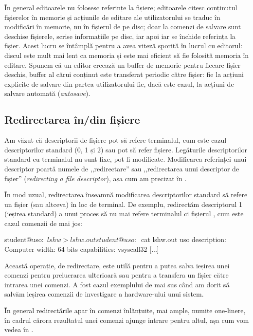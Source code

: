 În general editoarele
nu folosesc referințe la fișiere; editoarele citesc conținutul fișierelor în
memorie și acțiunile de editare ale utilizatorului se traduc în modificări în
memorie, nu în fișierul de pe disc; doar la comenzi de salvare sunt deschise
fișierele, scrise informațiile pe disc, iar apoi iar se închide referința la
fișier. Acest lucru se întâmplă pentru a avea viteză sporită în lucrul cu
editorul: discul este mult mai lent ca memoria și este mai eficient să fie
folosită memoria în editare. Spunem că un editor creează un buffer de memorie
pentru fiecare fișier deschis, buffer al cărui conținut este transferat periodic
către fișier: fie la acțiuni explicite de salvare din partea utilizatorului fie,
dacă este cazul, la acțiuni de salvare automată (\textit{autosave}).

\subsection{Redirectarea în/din fișiere}
\label{sec:procese-fisiere-redirectare}

Am văzut că descriptorii de fișiere pot să refere terminalul, cum este cazul
descriptorilor standard (0, 1 și 2) sau pot să refer fișiere. Legăturile
descriptorilor standard cu terminalul nu sunt fixe, pot fi modificate.
Modificarea referinței unui descriptor poartă numele de ,,redirectare'' sau
,,redirectarea unui descriptor de fișier'' (\textit{redirecting a file
descriptor}), așa cum am precizat în .

În mod uzual, redirectarea înseamnă modificarea descriptorilor standard să
refere un fișier (sau altceva) în loc de terminal. De exemplu, redirectăm
descriptorul 1 (ieșirea standard) a unui proces să nu mai refere terminalul ci
fișierul , cum este cazul comenzii de mai jos:

\begin{screen}
student@uso:~$ lshw > lshw.out
student@uso:~$ cat lshw.out
uso
    description: Computer
    width: 64 bits
    capabilities: vsyscall32
[...]
\end{screen}

Această operație, de redirectare, este utilă pentru a putea salva ieșirea unei
comenzi pentru prelucrarea ulterioară sau pentru a transfera un fișier către
intrarea unei comenzi. A fost cazul exemplului de mai sus când am dorit să
salvăm ieșirea comenzii de investigare a hardware-ului unui sistem.

În general redirectările apar în comenzi înlănțuite, mai ample, numite
one-linere, în cadrul cărora rezultatul unei comenzi ajunge intrare pentru
altul, așa cum vom vedea în
.

